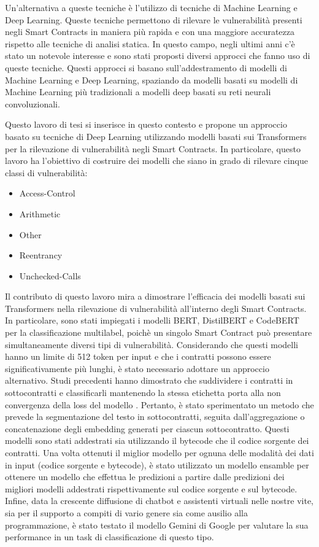\documentclass[../../Thesis.tex]{subfiles}
\begin{document}
Un'alternativa a queste tecniche \`e l'utilizzo di tecniche di Machine Learning e Deep Learning. Queste tecniche permettono di rilevare le vulnerabilit\`a presenti negli Smart Contracts in maniera pi\`u rapida e con una maggiore accuratezza rispetto alle tecniche di analisi statica. In questo campo, negli ultimi anni c'\`e stato un notevole interesse e sono stati proposti diversi approcci che fanno uso di queste tecniche. Questi approcci si basano sull'addestramento di modelli di Machine Learning e Deep Learning, spaziando da modelli basati su modelli di Machine Learning pi\`u tradizionali a modelli deep basati su reti neurali convoluzionali. 

Questo lavoro di tesi si inserisce in questo contesto e propone un approccio basato su tecniche di Deep Learning utilizzando modelli basati sui Transformers per la rilevazione di vulnerabilit\`a negli Smart Contracts. In particolare, questo lavoro ha l'obiettivo di costruire dei modelli che siano in grado di rilevare cinque classi di vulnerabilit\`a:
\begin{itemize}
    \item Access-Control
    \item Arithmetic
    \item Other
    \item Reentrancy
    \item Unchecked-Calls
\end{itemize}

 
Il contributo di questo lavoro mira a dimostrare l'efficacia dei modelli basati sui Transformers nella rilevazione di vulnerabilit\`a all'interno degli Smart Contracts. In particolare, sono stati impiegati i modelli BERT, DistilBERT e CodeBERT per la classificazione multilabel, poich\`e un singolo Smart Contract pu\`o presentare simultaneamente diversi tipi di vulnerabilit\`a. Considerando che questi modelli hanno un limite di 512 token per input e che i contratti possono essere significativamente pi\`u lunghi, \`e stato necessario adottare un approccio alternativo. Studi precedenti hanno dimostrato che suddividere i contratti in sottocontratti e classificarli mantenendo la stessa etichetta porta alla non convergenza della loss del modello \cite{CodeBERTPaper}. Pertanto, \`e stato sperimentato un metodo che prevede la segmentazione del testo in sottocontratti, seguita dall'aggregazione o concatenazione degli embedding generati per ciascun sottocontratto. Questi modelli sono stati addestrati sia utilizzando il bytecode che il codice sorgente dei contratti. 
Una volta ottenuti il miglior modello per ognuna delle modalit\`a dei dati in input (codice sorgente e bytecode), \`e stato utilizzato un modello ensamble per ottenere un modello che effettua le predizioni a partire dalle predizioni dei migliori modelli addestrati rispettivamente sul codice sorgente e sul bytecode. 
Infine, data la crescente diffusione di chatbot e assistenti virtuali nelle nostre vite, sia per il supporto a compiti di vario genere sia come ausilio alla programmazione, \`e stato testato il modello Gemini di Google per valutare la sua performance in un task di classificazione di questo tipo. 
\end{document}

